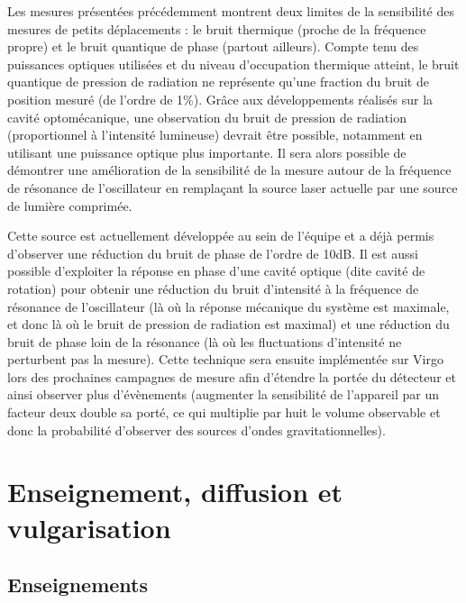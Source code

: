 \documentclass[12pt,a4paper]{article}
\begin{document}
Les mesures présentées précédemment montrent deux limites de la sensibilité des mesures de petits déplacements : le bruit thermique (proche de la fréquence propre) et le bruit quantique de phase (partout ailleurs).
Compte tenu des puissances optiques utilisées et du niveau d'occupation thermique atteint, le bruit quantique de pression de radiation ne représente qu'une fraction du bruit de position mesuré (de l'ordre de \unit{1}{\%}).
Grâce aux développements réalisés sur la cavité optomécanique, une observation du bruit de pression de radiation (proportionnel à l'intensité lumineuse) devrait être possible, notamment en utilisant une puissance optique plus importante.
Il sera alors possible de démontrer une amélioration de la sensibilité de la mesure autour de la fréquence de résonance de l'oscillateur en remplaçant la source laser actuelle par une source de lumière comprimée.

Cette source est actuellement développée au sein de l'équipe et a déjà permis d'observer une réduction du bruit de phase de l'ordre de \unit{10}{dB}.
Il est aussi possible d'exploiter la réponse en phase d'une cavité optique (dite cavité de rotation) pour obtenir une réduction du bruit d'intensité à la fréquence de résonance de l'oscillateur (là où la réponse mécanique du système est maximale, et donc là où le bruit de pression de radiation est maximal) et une réduction du bruit de phase loin de la résonance (là où les fluctuations d'intensité ne perturbent pas la mesure).
Cette technique sera ensuite implémentée sur Virgo lors des prochaines campagnes de mesure afin d'étendre la portée du détecteur et ainsi observer plus d'évènements (augmenter la sensibilité de l'appareil par un facteur deux double sa porté, ce qui multiplie par huit le volume observable et donc la probabilité d'observer des sources d'ondes gravitationnelles).

\section{Enseignement, diffusion et vulgarisation}

\subsection{Enseignements}
\end{document}
